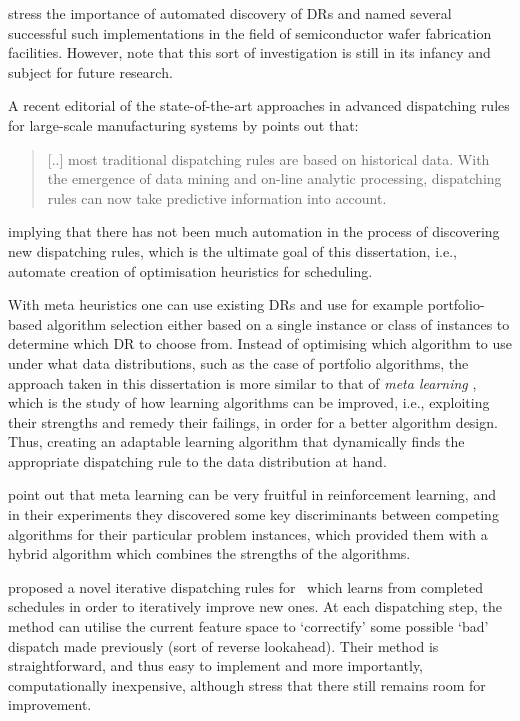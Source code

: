 \citet{Monch13} stress the importance of automated discovery of DRs and named 
several successful such implementations in the field of semiconductor wafer 
fabrication facilities. 
However, \citeauthor{Monch13} note that this sort of investigation is still in 
its infancy and subject for future research.

\clearpage
A recent editorial of the state-of-the-art approaches in advanced dispatching 
rules for large-scale manufacturing systems by \citet{Chen13} points out that:
\begin{quote}
    [..] most traditional dispatching rules are based on historical data. With 
    the emergence of data mining and on-line analytic processing, dispatching 
    rules can now take predictive information into account.
\end{quote}
implying that there has not been much automation in the process of discovering 
new dispatching rules, which is the ultimate goal of this dissertation, i.e., 
automate creation of optimisation heuristics for scheduling. 

With meta heuristics one can use existing DRs and use for example 
{portfolio-based algorithm selection} either based 
on a single instance \citep{Rice76,Gomes01} or class of instances \citep{Xu07} 
to determine which DR to choose from. 
Instead of optimising which algorithm to use under what data distributions, 
such as the case of portfolio algorithms, the approach taken in this 
dissertation is more similar to that of \emph{meta learning} \citep{Vilalta02}, 
which is the study of how learning algorithms can be improved, i.e., exploiting 
their strengths and remedy their failings, in order for a better algorithm 
design. Thus, creating an adaptable learning algorithm that dynamically finds 
the appropriate dispatching rule  to the data distribution at hand. 

\citet{Kalyanakrishnan11} point out that meta learning can be very fruitful in 
reinforcement learning, and in their experiments they discovered some key 
discriminants between competing algorithms for their particular problem 
instances, which provided them with a hybrid algorithm which combines the 
strengths of the algorithms.

\citet{Nguyen13} proposed a novel {iterative dispatching rules} for \JSP\ 
which learns from completed schedules in order to iteratively improve new ones. 
At each dispatching step, the method can utilise the current feature space to 
`correctify' some possible `bad' dispatch made previously (sort of reverse 
lookahead). Their method is straightforward, and thus easy to implement and 
more importantly, computationally inexpensive, although \citeauthor{Nguyen13} 
stress that there still remains room for improvement. 

